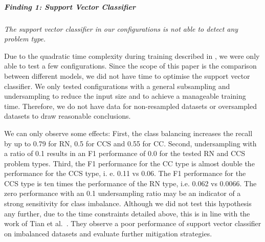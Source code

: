 \subparagraph{Finding 1: Support Vector Classifier} 
\textit{The support vector classifier in our configurations is not able to detect any problem type.}

Due to the quadratic time complexity during training described in , we were only able to test a few configurations. Since the scope of this paper is the comparison between different models, we did not have time to optimise the support vector classifier. We only tested configurations with a general subsampling and undersampling to reduce the input size and to achieve a manageable training time. Therefore, we do not have data for non-resampled datasets or oversampled datasets to draw reasonable conclusions. 

We can only observe some effects:
First, the class balancing increases the recall by up to 0.79 for RN, 0.5 for CCS and 0.55 for CC. Second, undersampling with a ratio of 0.1 results in an F1 performance of 0.0 for the tested RN and CCS problem types. Third, the F1 performance for the CC type is almost double the performance for the CCS type, i. e. 0.11 vs 0.06. The F1 performance for the CCS type is ten times the performance of the RN type, i.e. 0.062 vs 0.0066. 
The zero performance with an 0.1 undersampling ratio may be an indicator of a strong sensitivity for class imbalance. Although we did not test this hypothesis any further, due to the time constraints detailed above, this is in line with the work of Tian et al.~\cite{tian_imbalanced_2011}. They observe a poor performance of support vector classifier on imbalanced datasets and evaluate further mitigation strategies. 

\begin{center}
\end{center}


